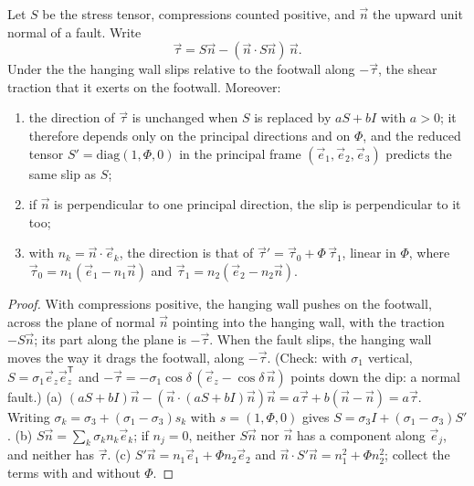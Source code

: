 \begin{theorem}\label{thm:b3:structural-analysis:wallace-bott}
Let $S$ be the stress tensor, compressions counted positive, and $\vec n$ the
upward unit normal of a fault. Write
\[
  \vec\tau = S\vec n - (\vec n\cdot S\vec n)\,\vec n .
\]
Under the  the hanging wall slips relative to the
footwall along $-\vec\tau$, the shear traction that it exerts on the
footwall. Moreover:
\begin{enumerate}[label=(\alph*)]
  \item the direction of $\vec\tau$ is unchanged when $S$ is replaced by $aS +
        bI$ with $a > 0$; it therefore depends only on the principal
        directions and on $\Phi$, and the reduced tensor $S' =
        \mathrm{diag}(1, \Phi, 0)$ in the principal frame $(\vec e_1, \vec
        e_2, \vec e_3)$ predicts the same slip as $S$;
  \item if $\vec n$ is perpendicular to one principal direction, the slip is
        perpendicular to it too;
  \item with $n_k = \vec n\cdot\vec e_k$, the direction is that of $\vec\tau'
        = \vec\tau_0 + \Phi\,\vec\tau_1$, linear in $\Phi$, where $\vec\tau_0
        = n_1(\vec e_1 - n_1\vec n)$ and $\vec\tau_1 = n_2(\vec e_2 - n_2\vec
        n)$.
\end{enumerate}
\end{theorem}

\begin{proof}
With compressions positive, the hanging wall pushes on the footwall, across
the plane of normal $\vec n$ pointing into the hanging wall, with the
traction $-S\vec n$; its part along the plane is $-\vec\tau$. When the
fault slips, the hanging wall moves the way it drags the footwall, along
$-\vec\tau$. (Check: with $\sigma_1$ vertical, $S = \sigma_1\vec e_z\vec
e_z^{\mathsf T}$ and $-\vec\tau = -\sigma_1\cos\delta\,(\vec e_z -
\cos\delta\,\vec n)$ points down the dip: a normal fault.)
(a) $(aS + bI)\vec n - (\vec n\cdot(aS + bI)\vec n)\vec n = a\vec\tau + b(\vec
n - \vec n) = a\vec\tau$. Writing $\sigma_k = \sigma_3 + (\sigma_1 -
\sigma_3)s_k$ with $s = (1, \Phi, 0)$ gives $S = \sigma_3 I + (\sigma_1 -
\sigma_3)S'$.
(b) $S\vec n = \sum_k\sigma_kn_k\vec e_k$; if $n_j = 0$, neither $S\vec n$
nor $\vec n$ has a component along $\vec e_j$, and neither has $\vec\tau$.
(c) $S'\vec n = n_1\vec e_1 + \Phi n_2\vec e_2$ and $\vec n\cdot S'\vec n =
n_1^2 + \Phi n_2^2$; collect the terms with and without $\Phi$.
\end{proof}

